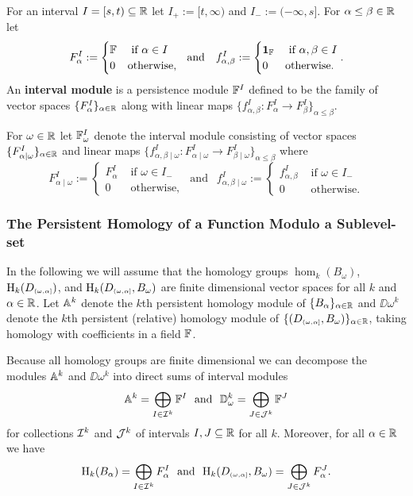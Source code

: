 
For an interval $I = [s,t)\subseteq \R$ let $I_+ := [t,\infty)$ and $I_- := (-\infty, s]$.
For $\alpha\leq\beta\in\R$ let
\[ F_\alpha^I := \begin{cases} \FF&\text{ if } \alpha\in I\\ 0 &\text{otherwise,}\end{cases}\ \text{ and }\ \ f_{\alpha,\beta}^I := \begin{cases} \id_\FF&\text{ if } \alpha,\beta\in I\\ 0&\text{otherwise.}\end{cases}.\]
An \textbf{interval module} is a persistence module $\FF^I$ defined to be the family of vector spaces $\{F_\alpha^I\}_{\alpha\in\R}$ along with linear maps $\{f_{\alpha,\beta}^I : F_\alpha^I\to F_\beta^I\}_{\alpha\leq\beta}$.

For $\omega\in\R$ let $\FF_\omega^I$ denote the interval module consisting of vector spaces $\{F_{\alpha\mid\omega}^I\}_{\alpha\in\R}$ and linear maps $\{f_{\alpha,\beta\mid \omega}^I : F_{\alpha\mid\omega}^I\to F_{\beta\mid\omega}^I\}_{\alpha\leq\beta}$ where
\[ F_{\alpha\mid \omega}^I := \begin{cases} F_\alpha^I&\text{ if } \omega\in I_-\\ 0&\text{ otherwise,}\end{cases}\ \text{ and }\ \ f_{\alpha,\beta\mid\omega}^I := \begin{cases} f_{\alpha,\beta}^I&\text{ if } \omega\in I_-\\ 0&\text{ otherwise.}\end{cases}\]

\subsubsection{The Persistent Homology of a Function Modulo a Sublevel-set}

In the following we will assume that the homology groups $\hom_k(B_\omega)$, $\hom_k(D\subi{\omega,\alpha})$, and $\hom_k(D\subi{\omega,\alpha}, B_\omega)$ are finite dimensional vector spaces for all $k$ and $\alpha\in\R$.
Let $\AA^k$ denote the $k$th persistent homology module of $\{B_\alpha\}_{\alpha\in\R}$ and $\DD{\omega}^k$ denote the $k$th persistent (relative) homology module of $\{(D\subi{\omega,\alpha},B_\omega)\}_{\alpha\in\R}$, taking homology with coefficients in a field $\FF$.

Because all homology groups are finite dimensional we can decompose the modules $\AA^k$ and $\DD{\omega}^k$ into direct sums of interval modules
\[ \AA^k = \bigoplus_{I\in\I^k} \FF^I\ \text{ and }\ \DD{\omega}^k = \bigoplus_{J\in\J^k} \FF^J\]
for collections $\I^k$ and $\J^k$ of intervals $I,J\subseteq \R$ for all $k$.
Moreover, for all $\alpha\in\R$ we have
\[ \hom_k(B_\alpha) = \bigoplus_{I\in \I^k}F_\alpha^I\ \text{ and }\ \hom_k(D\subi{\omega,\alpha}, B_\omega) = \bigoplus_{J\in\J^k} F_\alpha^J.\]

